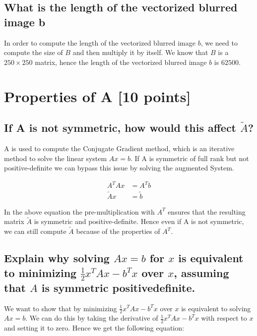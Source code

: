 \documentclass[unicode,11pt,a4paper,oneside,numbers=endperiod,openany]{scrartcl}
\begin{document}
\subsection{What is the length of the vectorized blurred image b}
In order to compute the length of the vectorized blurred image $b$, we need to compute the size of $B$ and then multiply it by itself. We know that $B$ is a $250 \times 250$ matrix, hence the length of the vectorized blurred image $b$ is $62500$.

\section{Properties of A [10 points]}
\subsection{If A is not symmetric, how would this affect $\tilde{A}$?}
A is used to compute the Conjugate Gradient method, which is an iterative method to solve the linear system $Ax = b$. If A is symmetric of full rank but not positive-definite we can bypass this issue by solving the augmented System.

\begin{align}
    A^TAx      & = A^Tb      \\
    \tilde{A}x & = \tilde{b}
\end{align}

In the above equation the pre-multiplication with $A^T$ ensures that the resulting matrix $\tilde{A}$ is symmetric and positive-definite. Hence even if A is not symmetric, we can still compute $\tilde{A}$ because of the properties of $A^T$.

\subsection{Explain why solving $Ax = b$ for $x$ is equivalent to minimizing $\frac{1}{2} x^T Ax - b^Tx$ over $x$, assuming that $A$ is symmetric positive\textendash definite.}

We want to show that by minimizing $\frac{1}{2} x^T Ax - b^Tx$ over $x$ is equivalent to solving $Ax = b$. We can do this by taking the derivative of $\frac{1}{2} x^T Ax - b^Tx$ with respect to $x$ and setting it to zero. Hence we get the following equation:
\end{document}
